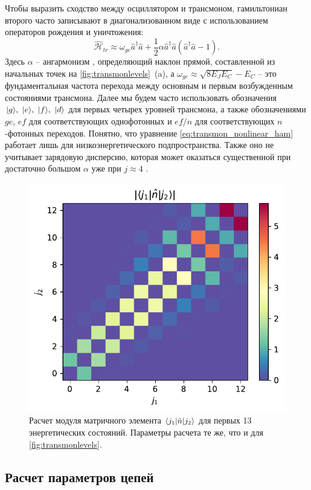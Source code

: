 \documentclass[14pt, a4paper]{extreport}
\DeclarePairedDelimiter\bra{\langle}{\rvert}
\DeclarePairedDelimiter\ket{\lvert}{\rangle}
\numberwithin{equation}{section}
\begin{document}
Чтобы выразить сходство между осциллятором и трансмоном, гамильтониан второго часто записывают в диагонализованном виде с использованием операторов рождения и уничтожения:
\begin{equation}
	\hat{\mathcal{H}}_{tr} \approx \omega_{ge} \hat a^\dag \hat a + \frac{1}{2}\alpha \hat a^\dag \hat a(\hat a^\dag \hat a - 1).\label{eq:transmon_nonlinear_ham}
\end{equation}
Здесь $\alpha$ -- ангармонизм \cite{koch2007charge}, определяющий наклон прямой, составленной из начальных точек на \autoref{fig:transmonlevels}~(a), а $\omega_{ge} \approx \sqrt{8 E_J E_C} - E_C$ -- это фундаментальная частота перехода между основным и первым возбужденным состояниями трансмона. Далее мы будем часто использовать обозначения $\ket{g},\ \ket{e},\ \ket{f},\ \ket{d}$ для первых четырех уровней трансмона, а также обозначениями $ge$, $ef$ для соответствующих однофотонных и $ef/n$ для соответствующих $n$-фотонных переходов. Понятно, что уравнение \eqref{eq:transmon_nonlinear_ham} работает лишь для низкоэнергетического подпространства. Также оно не учитывает зарядовую дисперсию, которая может оказаться существенной при достаточно большом $\alpha$ уже при $j \approx 4$ \cite{peterer2015coherence}.


\begin{figure}
	\centering
	\includegraphics[width=0.5\linewidth]{Pictures/transmon_n_melements}
	\caption{Расчет модуля матричного элемента $\bra{j_1} \hat n \ket{j_2}$ для первых 13 энергетических состояний. Параметры расчета те же, что и для \autoref{fig:transmonlevels}.}
	\label{fig:transmonnmelements}
\end{figure}


\subsection{Расчет параметров цепей}
\end{document}
